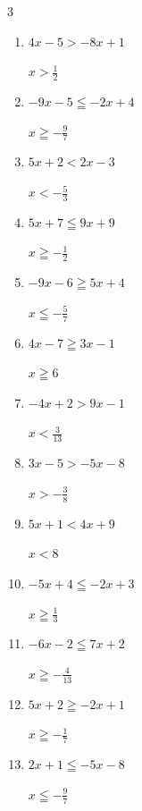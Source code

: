 \begin{multicols}{3}
\begin{enumerate}
        $\displaystyle x\leqq 5$

  \item $4x-5>-8x+1$

        $\displaystyle x>\frac{1}{2}$

\columnbreak %

\resetques

  \item $-9x-5\leqq -2x+4$

        $\displaystyle x\geqq -\frac{9}{7}$

  \item $5x+2<2x-3$

        $\displaystyle x<-\frac{5}{3}$

  \item $5x+7\leqq 9x+9$

        $\displaystyle x\geqq -\frac{1}{2}$

  \item $-9x-6\geqq 5x+4$

        $\displaystyle x\leqq -\frac{5}{7}$

  \item $4x-7\geqq 3x-1$

        $\displaystyle x\geqq 6$

  \item $-4x+2>9x-1$

        $\displaystyle x<\frac{3}{13}$

  \item $3x-5>-5x-8$

        $\displaystyle x>-\frac{3}{8}$

  \item $5x+1<4x+9$

        $\displaystyle x<8$

  \item $-5x+4\leqq -2x+3$

        $\displaystyle x\geqq \frac{1}{3}$

  \item $-6x-2\leqq 7x+2$

        $\displaystyle x\geqq -\frac{4}{13}$

  \item $5x+2\geqq -2x+1$

        $\displaystyle x\geqq -\frac{1}{7}$

  \item $2x+1\leqq -5x-8$

        $\displaystyle x\leqq -\frac{9}{7}$


\end{enumerate}
\end{multicols}
